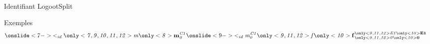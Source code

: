 \begin{frame}{Identifiant LogootSplit}
{\begin{block}{Exemples}
\begin{equation*}
                \onslide<7->{
                    \lid \id{
                        \only<7,9,10,11,12>{m}
                        \only<8>{\mathbf{m}}
                    }{C1}{0}
                }
                \onslide<9->{
                    \lid \id{m}{C1}{0}\id{
                        \only<9,11,12>{f}
                        \only<10>{\mathbf{f}}
                    }{
                        \only<9,11,12>{E1}
                        \only<10>{\mathbf{E1}}
                    }{
                        \only<9,11,12>{0}
                        \only<10>{\mathbf{0}}
                    }
                }
            \end{equation*}
        \end{block}
    }
\end{frame}

